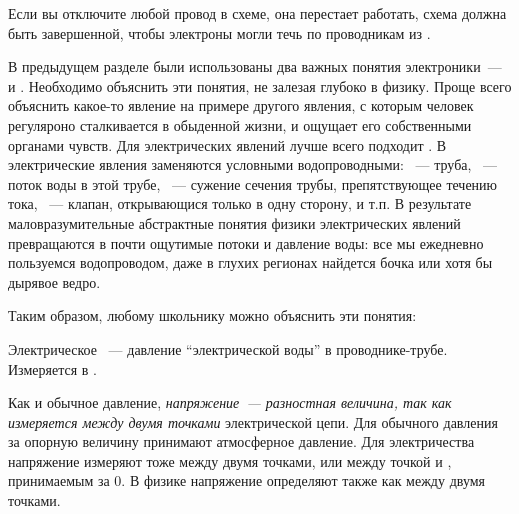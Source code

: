 \bigskip
Если вы отключите любой провод в схеме, она перестает работать, схема должна
быть завершенной, чтобы электроны могли течь по проводникам из
.


В предыдущем разделе были использованы два важных понятия электроники\ ---
 и . Необходимо объяснить эти
понятия, не залезая глубоко в физику. Проще всего объяснить какое-то явление на
примере другого явления, с которым человек регуляроно сталкивается в обыденной
жизни, и ощущает его собственными органами чувств. Для электрических явлений
лучше всего подходит .
В  электрические явления заменяются условными водопроводными:
\ --- труба, \ --- поток воды в этой трубе,
\ --- сужение сечения трубы, препятствующее течению
тока, \ --- клапан, открывающися только в одну сторону, и
т.п. В результате маловразумительные абстрактные понятия физики электрических
явлений превращаются в почти ощутимые потоки и давление воды: все мы ежедневно
пользуемся водопроводом, даже в глухих регионах найдется бочка или хотя
бы дырявое ведро.

\bigskip
Таким образом, любому школьнику можно объяснить эти понятия:

\begin{framed}
\noindent
Электрическое \ --- давление ``электрической
воды'' в проводнике-трубе.\\
Измеряется в . 
\end{framed}

Как и обычное давление, \emph{напряжение\ --- разностная величина, так как
измеряется между двумя точками} электрической цепи. Для обычного давления за
опорную величину принимают атмосферное давление. Для электричества
напряжение измеряют тоже между двумя точками, или между точкой и , принимаемым за 0. В физике напряжение определяют также
как  между двумя точками.

